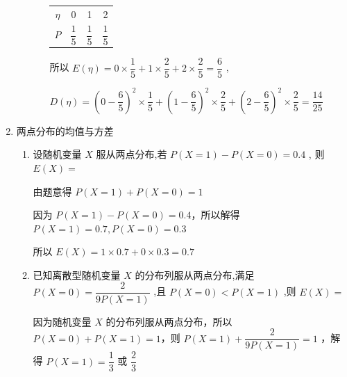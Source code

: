 \begin{enumerate}
\begin{enumerate}
\begin{jieda}
\begin{enumerate}
                \begin{center}
                
                \begin{tabular}{|c|c|c|c|}
                \hline
                $\eta$ & 0 & 1 & 2 \\
                \cline{1-4}
                $P$ & $\dfrac{1}{5}$ & $\dfrac{1}{5}$ & $\dfrac{1}{5}$ \\
                \cline{1-4}
                \hline
                \end{tabular}
                
                \end{center}
                
                所以 $E\left( \eta \right)  = 0 \times  \dfrac{1}{5} + 1 \times  \dfrac{2}{5} + 2 \times  \dfrac{2}{5} = \dfrac{6}{5}$ ,
                
                $D\left( \eta \right)  = {\left( 0 - \dfrac{6}{5}\right) }^{2} \times  \dfrac{1}{5} + {\left( 1 - \dfrac{6}{5}\right) }^{2} \times  \dfrac{2}{5} + {\left( 2 - \dfrac{6}{5}\right) }^{2} \times  \dfrac{2}{5} = \dfrac{14}{25}$
            \end{enumerate}
        \end{jieda}
    \end{enumerate}

    \item 两点分布的均值与方差
    \begin{enumerate}
        \item 设随机变量 $X$ 服从两点分布,若 $P\left( {X = 1}\right)  - P\left( {X = 0}\right)  = {0.4}$ , 则 $E\left( X\right)  =$
        \begin{jieda}
            由题意得 $P\left( {X = 1}\right)  + P\left( {X = 0}\right)  = 1$
            
            因为 $P\left( {X = 1}\right)  - P\left( {X = 0}\right)  = {0.4}$，所以解得 $P\left( {X = 1}\right)  = {0.7},P\left( {X = 0}\right)  = {0.3}$
            
            所以 $E\left( X\right)  = 1 \times  {0.7} + 0 \times  {0.3} = {0.7}$
        \end{jieda}

        \item 已知离散型随机变量 $X$ 的分布列服从两点分布,满足 $P(X =  0) = \dfrac{2}{{9P}\left( {X = 1}\right) }$ ,且 $P\left( {X = 0}\right)  < P\left( {X = 1}\right)$ ,则 $E\left( X\right)  =$
        \begin{jieda}
            因为随机变量 $X$ 的分布列服从两点分布，所以 $P\left( {X = 0}\right)  + P\left( {X = 1}\right)  = 1$，则 $P\left( {X = 1}\right)  + \dfrac{2}{{9P}\left( {X = 1}\right) } = 1$ ，解得 $P\left( {X = 1}\right)  = \dfrac{1}{3}$ 或 $\dfrac{2}{3}$
            

\end{jieda}
\end{enumerate}
\end{enumerate}
